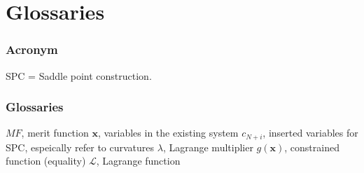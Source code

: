 \chapter{Glossaries} %
\label{glossaries} %
\captionsetup[figure]{labelfont=bf}
\captionsetup{margin=1.5em}
\captionsetup[table]{labelfont=bf}



\subsection{Acronym}
SPC = Saddle point construction.

\subsection{Glossaries}
$MF$, merit function
$\textbf{x}$, variables in the existing system
$c_{N+i}$, inserted variables for SPC, espeically refer to curvatures
$\lambda$, Lagrange multiplier
$g(\textbf{x})$, constrained function (equality)
$\mathcal{L}$, Lagrange function










